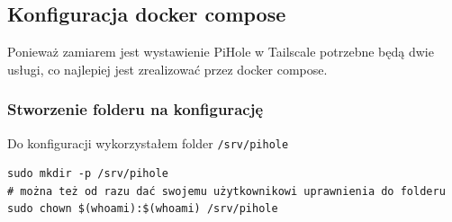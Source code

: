 \documentclass[../main.tex]{subfiles}
\begin{document}
\subsection{Konfiguracja docker compose}
Ponieważ zamiarem jest wystawienie PiHole w Tailscale potrzebne będą dwie usługi, co najlepiej jest zrealizować przez docker compose.

\subsubsection{Stworzenie folderu na konfigurację}
Do konfiguracji wykorzystałem folder \texttt{/srv/pihole}
\begin{verbatim}
sudo mkdir -p /srv/pihole
# można też od razu dać swojemu użytkownikowi uprawnienia do folderu
sudo chown $(whoami):$(whoami) /srv/pihole
\end{verbatim}
\end{document}
